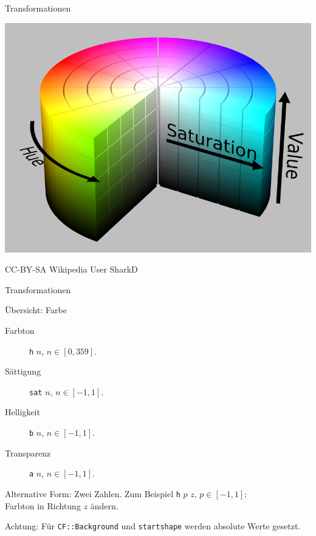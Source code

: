 \documentclass{beamer}
\theoremstyle{example}
\begin{document}
\begin{frame}{Transformationen}
\begin{center}
\includegraphics[width=0.7\linewidth]{./images/HSV.png}
\end{center}
\hfill{{\tiny CC-BY-SA Wikipedia User SharkD}}
\end{frame}

\begin{frame}{Transformationen}
\begin{block}{Übersicht: Farbe}
  \begin{description}
  \item[Farbton] \lstinline!h! {\small $n$}, $n\in [0,359]$. 
  \item[Sättigung] \lstinline!sat! {\small $n$}, $n\in [-1,1]$. 
  \item[Helligkeit] \lstinline!b! {\small $n$}, $n\in [-1,1]$.
  \item[Transparenz] \lstinline!a! {\small $n$}, $n\in [-1,1]$.
  \end{description}
\end{block}
Alternative Form: Zwei Zahlen. Zum Beispiel \lstinline!h! {\small $p$ $z$}, $p\in [-1,1]$:\\ Farbton in Richtung $z$ ändern.

\alert{Achtung:} Für \lstinline!CF::Background! und \lstinline!startshape! werden absolute Werte gesetzt.
\end{frame}
\end{document}
